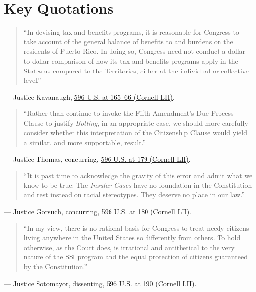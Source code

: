 \documentclass[12pt]{article}
\begin{document}
\section{Key Quotations}
\begin{quote}
``In devising tax and benefits programs, it is reasonable for Congress to take account of the general balance of benefits to and burdens on the residents of Puerto Rico. In doing so, Congress need not conduct a dollar-to-dollar comparison of how its tax and benefits programs apply in the States as compared to the Territories, either at the individual or collective level.''
\end{quote}
\noindent --- Justice Kavanaugh, \href{https://www.law.cornell.edu/supremecourt/text/20-303}{596 U.S. at 165--66 (Cornell LII)}.

\begin{quote}
``Rather than continue to invoke the Fifth Amendment's Due Process Clause to justify \emph{Bolling}, in an appropriate case, we should more carefully consider whether this interpretation of the Citizenship Clause would yield a similar, and more supportable, result.''
\end{quote}
\noindent --- Justice Thomas, concurring, \href{https://www.law.cornell.edu/supremecourt/text/20-303}{596 U.S. at 179 (Cornell LII)}.

\begin{quote}
``It is past time to acknowledge the gravity of this error and admit what we know to be true: The \emph{Insular Cases} have no foundation in the Constitution and rest instead on racial stereotypes. They deserve no place in our law.''
\end{quote}
\noindent --- Justice Gorsuch, concurring, \href{https://www.law.cornell.edu/supremecourt/text/20-303}{596 U.S. at 180 (Cornell LII)}.

\begin{quote}
``In my view, there is no rational basis for Congress to treat needy citizens living anywhere in the United States so differently from others. To hold otherwise, as the Court does, is irrational and antithetical to the very nature of the SSI program and the equal protection of citizens guaranteed by the Constitution.''
\end{quote}
\noindent --- Justice Sotomayor, dissenting, \href{https://www.law.cornell.edu/supremecourt/text/20-303}{596 U.S. at 190 (Cornell LII)}.
\end{document}
